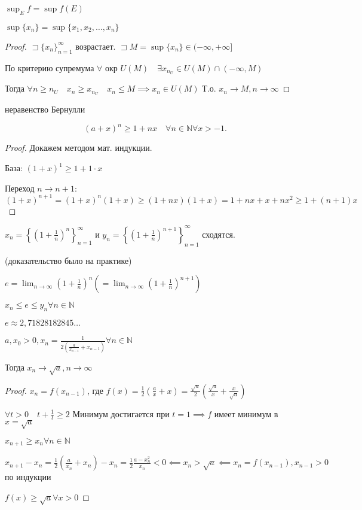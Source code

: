 \documentclass{book}
\newcommand\N{\ensuremath{\mathbb{N}}}
\theoremstyle{definition}
\begin{document}
$\sup_Ef = \sup f(E)$

$\sup\{x_{n}\} = \sup\{x_1, x_2, \ldots, x_{n} \}$

\begin{proof}
    $\sqsupset \{x_{n} \}_{n=1}^{\infty }$ возрастает. $\sqsupset M = \sup\{x_{n} \}\in (-\infty , +\infty ]$

    По критерию супремума $\forall $ окр $U(M)\quad \exists x_{n_U}\in U(M)\cap (-\infty , M)$

    Тогда $\forall n\geqslant n_U\quad x_n\geqslant x_{n_U}\quad x_n\leqslant M \implies x_n\in U(M)$ Т.о. $x_n\to M, n\to \infty $
\end{proof}

\begin{statement}
    неравенство Бернулли

    \[
        (a+x)^n\geqslant 1+nx\quad \forall n\in \N \forall x>-1
    .\] 
\end{statement}
\begin{proof}
    Докажем методом мат. индукции. 

    База: $(1+x)^1\geqslant 1+1\cdot x$

    Переход $n\to n+1$: $ (1+x)^{n+1} = (1+x)^n(1+x)\geqslant (1+nx)(1+x) = 1+nx+x+nx^2\geqslant 1+(n+1)x$
\end{proof}

\begin{theorem}
    $x_{n}  = \left\{ (1+\frac{1}{n})^n \right\} _{n=1}^{\infty }$ и $y_{n} = \left\{ \left( 1+\frac{1}{n} \right) ^{n+1} \right\}_{n=1}^{\infty } $ сходятся.

    (доказательство было на практике)

    $e = \lim_{n \to \infty} \left( 1+\frac{1}{n} \right) ^n\left( =\lim_{n \to \infty } \left( 1+\frac{1}{n} \right) ^{n+1} \right)$

    $x_n\leqslant e\leqslant y_{n} \forall n\in \N $

    $e\approx 2,71828182845\ldots$
\end{theorem}

\begin{statement}

    $a, x_0>0, x_{n} = \frac{1}{2\left( \frac{a}{x_{n-1}} + x_{n-1} \right) } \forall n\in \N $

    Тогда $x_n\to \sqrt{a}, n\to \infty  $
\end{statement}
\begin{proof}
    $x_{n}  = f(x_{n-1})$, где $f(x) = \frac{1}{2}\left( \frac{a}{x}+x \right)  = \frac{\sqrt{a} }{2}\left( \frac{\sqrt{a} }{x} + \frac{x}{\sqrt{a} } \right) $ 

    $\forall t>0\quad t + \frac{1}{t}\geqslant 2$ Минимум достигается при $t=1 \implies f$ имеет минимум в $x = \sqrt{a} $ 

    $x_{n+1}\geqslant x_n\forall n\in \N $

    $x_{n+1} - x_n = \frac{1}{2}\left( \frac{a}{x_n} + x_n \right) -x_n = \frac{1}{2}\frac{a-x_n^2}{x_n}<0 \impliedby x_n>\sqrt{a} \impliedby x_n = f(x_{n-1}), x_{n-1}>0 $ по индукции

    $f(x)\geqslant \sqrt{a} \forall x>0 $
\end{proof}
\end{document}
